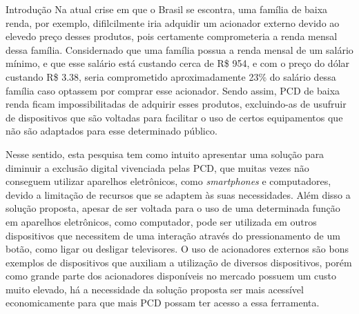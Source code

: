 \begin{chapter}{Introdução}
Na atual crise em que o Brasil se escontra, uma família de baixa renda, por
exemplo, difilcilmente iria adquidir um acionador externo devido ao elevedo
preço desses produtos, pois certamente comprometeria a renda mensal dessa
família.  Considernado que uma família possua a renda mensal de um salário
mínimo, e que esse salário está custando cerca de R\$ 954, e com o preço do
dólar custando R\$ 3.38, seria comprometido aproximadamente 23\% do salário
dessa família caso optassem por comprar esse acionador. Sendo assim, PCD de
baixa renda ficam impossibilitadas de adquirir esses produtos, excluindo-as de
usufruir de dispositivos que são voltadas para facilitar o uso de certos
equipamentos que não são adaptados para esse determinado público.

Nesse sentido, esta pesquisa tem como intuito apresentar uma solução para
diminuir a exclusão digital vivenciada pelas PCD, que muitas vezes não conseguem
utilizar aparelhos eletrônicos, como \textit{smartphones} e computadores, devido
a limitação de recursos que se adaptem às suas necessidades. Além disso a
solução proposta, apesar de ser voltada para o uso de uma determinada função em
aparelhos eletrônicos, como computador, pode ser utilizada em outros dispositivos
que necessitem de uma interação através do pressionamento de um botão, como
ligar ou desligar televisores. O uso de acionadores externos são bons
exemplos de dispositivos que auxiliam a utilização de diversos dispositivos,
porém como grande parte dos acionadores disponíveis no mercado possuem um custo
muito elevado, há a necessidade da solução proposta ser mais acessível
economicamente para que mais PCD possam ter acesso a essa ferramenta. %
 

\end{chapter}
